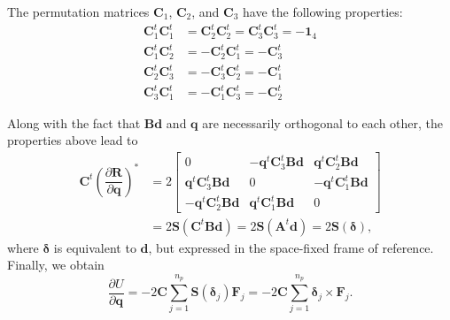 \documentclass[aip,jcp,reprint,amsmath,amssymb,raggedbottom]{revtex4-1}
\newcommand{\mt}[1]{\boldsymbol{\mathbf{#1}}}           %
\newcommand{\vt}[1]{\boldsymbol{\mathbf{#1}}}           %
\newcommand{\tr}[1]{#1^t}                               %
\newcommand{\diff}[2]{\dfrac{\partial #1}{\partial #2}} %
\begin{document}
The permutation matrices $\mt C_1$, $\mt C_2$, and $\mt C_3$ have the following properties:
\begin{equation}
\begin{aligned}
\tr{\mt C_1}\tr{\mt C_1} &= \tr{\mt C_2}\tr{\mt C_2} = \tr{\mt C_3}\tr{\mt C_3} = -\mt 1_4 \\
\tr{\mt C_1}\tr{\mt C_2} &= -\tr{\mt C_2}\tr{\mt C_1} = -\tr{\mt C_3} \\
\tr{\mt C_2}\tr{\mt C_3} &= -\tr{\mt C_3}\tr{\mt C_2} = -\tr{\mt C_1} \\
\tr{\mt C_3}\tr{\mt C_1} &= -\tr{\mt C_1}\tr{\mt C_3} = -\tr{\mt C_2}
\end{aligned}
\end{equation}

Along with the fact that $\mt B\vt d$ and $\vt q$ are necessarily orthogonal to each other, the properties above lead to
\begin{align*}
\tr{\mt C} \left( \diff{\vt R}{\vt q} \right)^\ast &= 2 \left[\begin{array}{ccc}
0 & -\tr{\vt q}\tr{\mt C}_3 \mt B \vt d & \tr{\vt q}\tr{\mt C}_2 \mt B \vt d \\
\tr{\vt q}\tr{\mt C}_3 \mt B \vt d & 0 & -\tr{\vt q}\tr{\mt C}_1 \mt B \vt d \\
-\tr{\vt q}\tr{\mt C}_2 \mt B \vt d & \tr{\vt q}\tr{\mt C}_1 \mt B \vt d & 0
\end{array}\right] \\
&= 2 \mt S(\tr{\mt C} \mt B \vt d) = 2 \mt S(\tr{\mt A}\vt d) = 2 \mt S(\vt \delta),
\end{align*}
where $\vt \delta$ is equivalent to $\vt d$, but expressed in the space-fixed frame of reference. Finally, we obtain
\[
\diff{U}{\vt q} = - 2 \mt C \sum_{j=1}^{n_p} \mt S(\vt \delta_j) {\vt F_j}  = - 2 \mt C \sum_{j=1}^{n_p} \vt \delta_j \times {\vt F_j}.
\]



\end{document}
